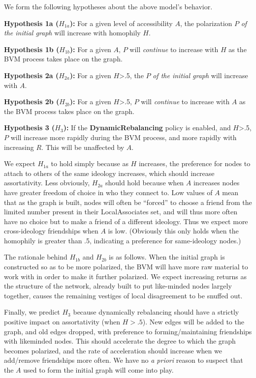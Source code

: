 
\label{sec:hypos}

We form the following hypotheses about the above model's behavior.

\begin{description}

\item{\textbf{Hypothesis 1a ($H_{1a}$):}} For a given level of accessibility
$A$, the polarization $P$ \textit{of the initial graph} will increase with
homophily $H$.

\item{\textbf{Hypothesis 1b ($H_{1b}$):}} For a given $A$, $P$ will
\textit{continue} to increase with $H$ as the BVM process takes place on the
graph.

\item{\textbf{Hypothesis 2a ($H_{2a}$):}} For a given $H$>.5, the $P$ \textit{of
the initial graph} will increase with $A$.

\item{\textbf{Hypothesis 2b ($H_{2b}$):}} For a given $H$>.5, $P$ will
\textit{continue} to increase with $A$ as the BVM process takes place on the
graph.

\item{\textbf{Hypothesis 3 ($H_3$):}} If the \textbf{DynamicRebalancing}
policy is enabled, and $H$>.5, $P$ will increase more rapidly during the BVM
process, and more rapidly with increasing $R$. This will be unaffected by $A$.

\end{description}

We expect $H_{1a}$ to hold simply because as $H$ increases, the preference for
nodes to attach to others of the same ideology increases, which should
increase assortativity. Less obviously, $H_{2a}$ should hold because when $A$
increases nodes have greater freedom of choice in who they connect to. Low
values of $A$ mean that as the graph is built, nodes will often be ``forced''
to choose a friend from the limited number present in their LocalAssociates
set, and will thus more often have no choice but to make a friend of a
different ideology. Thus we expect more cross-ideology friendships when $A$ is
low. (Obviously this only holds when the homophily is greater than .5,
indicating a preference for same-ideology nodes.)

The rationale behind $H_{1b}$ and $H_{2b}$ is as follows. When the initial
graph is constructed so as to be more polarized, the BVM will have more raw
material to work with in order to make it further polarized. We expect
increasing returns as the structure of the network, already built to put
like-minded nodes largely together, causes the remaining vestiges of local
disagreement to be snuffed out.

Finally, we predict $H_3$ because dynamically rebalancing should have a
strictly positive impact on assortativity (when $H>.5$). New edges will be
added to the graph, and old edges dropped, with preference to
forming/maintaining friendships with likeminded nodes. This should accelerate
the degree to which the graph becomes polarized, and the rate of acceleration
should increase when we add/remove friendships more often. We have no
\textit{a priori} reason to suspect that the $A$ used to form the initial
graph will come into play.
